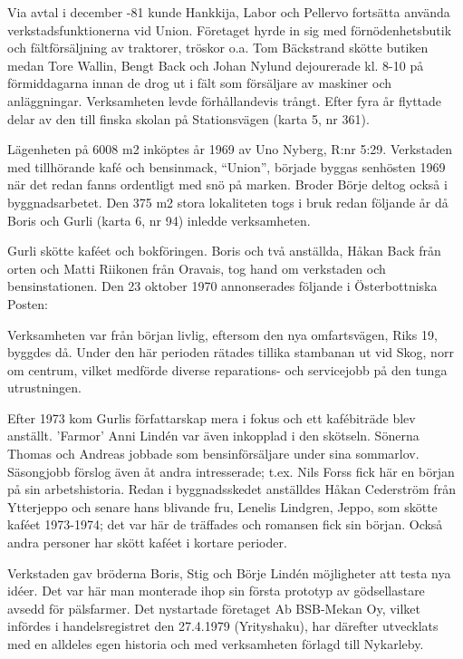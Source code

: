 Via avtal i december -81 kunde Hankkija, Labor och Pellervo fortsätta använda verkstadsfunktionerna vid Union.
Företaget hyrde in sig med förnödenhetsbutik och fältförsäljning av traktorer, tröskor o.a. Tom Bäckstrand skötte butiken medan Tore	Wallin, Bengt Back och Johan Nylund dejourerade kl. 8-10 på förmiddagarna innan de drog ut i fält som försäljare av maskiner och anläggningar. Verksamheten levde förhållandevis trångt. Efter fyra år flyttade delar av den till finska skolan på Stationsvägen (karta 5,  nr 361).



Lägenheten på 6008 m2 inköptes år 1969 av Uno Nyberg, R:nr 5:29. Verkstaden med tillhörande kafé och bensinmack, ``Union'', började	byggas senhösten 1969 när det redan fanns ordentligt med snö på marken. Broder Börje deltog också i byggnadsarbetet. Den 375 m2 stora lokaliteten togs i bruk redan följande år då Boris och Gurli	(karta 6, nr 94) inledde verksamheten.

Gurli skötte kaféet och bokföringen. Boris och två anställda, Håkan Back från orten och Matti Riikonen från Oravais, tog hand om verkstaden och bensinstationen. Den 23 oktober 1970 annonserades följande i Österbottniska Posten:


Verksamheten var från början livlig, eftersom den nya omfartsvägen, Riks 19, byggdes då. Under den här perioden rätades  tillika stambanan ut vid Skog, norr om centrum, vilket medförde diverse reparations- och servicejobb på den tunga utrustningen.

Efter 1973 kom Gurlis författarskap mera i fokus och ett kafébiträde blev anställt. 'Farmor' Anni Lindén var även inkopplad i den skötseln. Sönerna Thomas och Andreas jobbade som bensinförsäljare under sina sommarlov. Säsongjobb förslog även åt andra intresserade; t.ex. Nils Forss fick här en början på sin arbetshistoria. Redan i byggnadsskedet anställdes Håkan Cederström från Ytterjeppo och	senare hans blivande fru, Lenelis Lindgren, Jeppo, som skötte kaféet	1973-1974; det var här de träffades och romansen fick sin början.	Också andra personer har skött kaféet i kortare perioder.

Verkstaden gav bröderna Boris, Stig och Börje Lindén möjligheter att testa nya idéer. Det var här man monterade ihop sin första prototyp	av gödsellastare avsedd för pälsfarmer. Det nystartade företaget Ab	BSB-Mekan Oy, vilket infördes i handelsregistret den 27.4.1979 (Yrityshaku), har därefter utvecklats med en alldeles egen historia och med verksamheten förlagd till Nykarleby.



